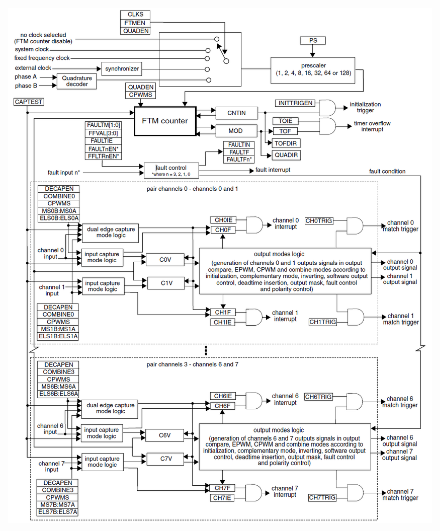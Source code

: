 \documentclass[10.5pt,scale=1.0,t,aspectratio=169,hyperref={pdfpagelabels=false}]{beamer}
\begin{document}
\begin{frame}
{\begin{columns}
			\begin{figure}
				\centering
				\includegraphics[scale=0.28]{05_PWMArchitecture}
			\end{figure}
		
		\end{columns}
	}
\end{frame}
\end{document}
